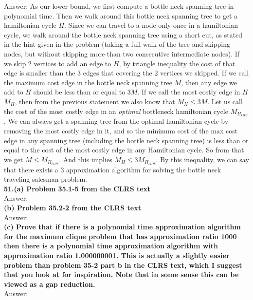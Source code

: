 \documentclass{article}
\begin{document}
Answer: As our lower bound, we first compute a bottle neck spanning tree in polynomial time. Then we walk around this bottle neck spanning tree to get a hamiltonian cycle $H$. Since we can travel to a node only once in a hamiltonian cycle, we walk around the bottle neck spanning tree using a short cut, as stated in the hint given in the problem (taking a full walk of the tree and skipping nodes, but without skipping more than two consecutive intermediate nodes). If we skip 2 vertices to add an edge to $H$, by triangle inequality the cost of that edge is smaller than the 3 edges that covering the 2 vertices we skipped. If we call the maximum cost edge in the bottle neck spanning tree $M$, then any edge we add to $H$ should be less than or equal to $3M$. If we call the most costly edge in $H$ $M_H$, then from the previous statement we also know that $M_H \leq 3M$. Let us call the cost of the most costly edge in an \textit{optimal} bottleneck hamiltonian cycle $M_{H_{OPT}}$.  We can always get a spanning tree from the optimal hamiltonian cycle by removing the most costly edge in it, and so the minimum cost of the max cost edge in any spanning tree (including the bottle neck spanning tree) is less than or equal to the cost of the most costly edge in any Hamiltonian cycle. So from that we get $M \leq M_{H_{OPT}}$. And this implies $M_H \leq 3 M_{H_{OPT}}$. By this inequality, we can say that there exists a 3 approximation algorithm for solving the bottle neck traveling salesman problem. \\ \newline
\textbf{51.(a) Problem 35.1-5 from the CLRS text} \\ \newline
Answer: \\ \newline
\textbf{(b) Problem 35.2-2 from the CLRS text} \\ \newline
Answer: \\ \newline
\textbf{(c) Prove that if there is a polynomial time approximation algorithm for the maximum clique problem that has approximation ratio 1000 then there is a polynomial time approximation algorithm with approximation ratio 1.000000001. This is actually a slightly easier problem than problem 35-2 part b in the CLRS text, which I suggest that you look at for inspiration. Note that in some sense this can be viewed as a gap reduction.}\\ \newline
Answer: 
\end{document}
